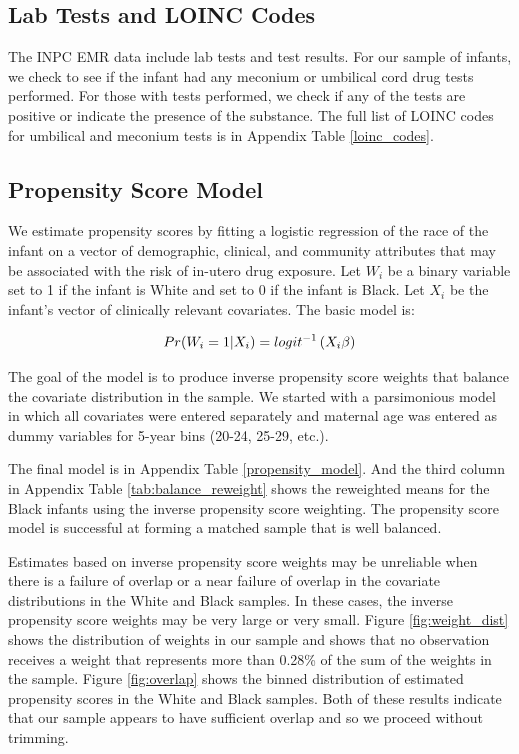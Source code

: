 \subsection*{Lab Tests and LOINC Codes}
The INPC EMR data include lab tests and test results. For our sample of infants, we check to see if the infant had any meconium or umbilical cord drug tests performed. For those with tests performed, we check if any of the tests are positive or indicate the presence of the substance. The full list of LOINC codes for umbilical and meconium tests is in Appendix Table \ref{loinc_codes}. 

\subsection*{Propensity Score Model}

We estimate propensity scores by fitting a logistic regression of the race of the infant on a vector of demographic, clinical, and community attributes that may be associated with the risk of in-utero drug exposure. Let $W_i$ be a binary variable set to 1 if the infant is White and set to 0 if the infant is Black. Let $X_i$ be the infant's vector of clinically relevant covariates. The basic model is:

$$
Pr(W_i = 1 | X_i) = logit^{-1}\left( X_i \beta \right)
$$

The goal of the model is to produce inverse propensity score weights that balance the covariate distribution in the sample. We started with a parsimonious model in which all covariates were entered separately and maternal age was entered as dummy variables for 5-year bins (20-24, 25-29, etc.). 

The final model is in Appendix Table \ref{propensity_model}. And the third column in Appendix Table \ref{tab:balance_reweight} shows the reweighted means for the Black infants using the inverse propensity score weighting. The propensity score model is successful at forming a matched sample that is well balanced.

Estimates based on inverse propensity score weights may be unreliable when there is a failure of overlap or a near failure of overlap in the covariate distributions in the White and Black samples. In these cases, the inverse propensity score weights may be very large or very small. Figure \ref{fig:weight_dist} shows the distribution of weights in our sample and shows that no observation receives a weight that represents more than 0.28\% of the sum of the weights in the sample. Figure \ref{fig:overlap} shows the binned distribution of estimated propensity scores in the White and Black samples. Both of these results indicate that our sample appears to have sufficient overlap and so we proceed without trimming.

